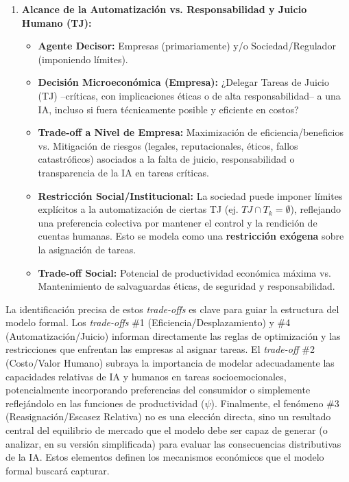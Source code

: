 \documentclass{article}
\theoremstyle{remark}
\theoremstyle{definition}
\begin{document}
\begin{enumerate}
\begin{tcolorbox}[title= Solución Punto 1 (Revisado - Versión Preferida)]
\begin{enumerate}
    \item \textbf{Alcance de la Automatización vs. Responsabilidad y Juicio Humano (TJ):}
         \begin{itemize}
            \item \textbf{Agente Decisor:} Empresas (primariamente) y/o Sociedad/Regulador (imponiendo límites).
            \item \textbf{Decisión Microeconómica (Empresa):} ¿Delegar Tareas de Juicio (TJ) –críticas, con implicaciones éticas o de alta responsabilidad– a una IA, incluso si fuera técnicamente posible y eficiente en costos?
            \item \textbf{Trade-off a Nivel de Empresa:} Maximización de eficiencia/beneficios vs. Mitigación de riesgos (legales, reputacionales, éticos, fallos catastróficos) asociados a la falta de juicio, responsabilidad o transparencia de la IA en tareas críticas.
            \item \textbf{Restricción Social/Institucional:} La sociedad puede imponer límites explícitos a la automatización de ciertas TJ (ej. $TJ \cap T_k = \emptyset$), reflejando una preferencia colectiva por mantener el control y la rendición de cuentas humanas. Esto se modela como una \textbf{restricción exógena} sobre la asignación de tareas.
            \item \textbf{Trade-off Social:} Potencial de productividad económica máxima vs. Mantenimiento de salvaguardas éticas, de seguridad y responsabilidad.
        \end{itemize}
\end{enumerate}

\vspace{1em} %

La identificación precisa de estos \textit{trade-offs} es clave para guiar la estructura del modelo formal. Los \textit{trade-offs} \#1 (Eficiencia/Desplazamiento) y \#4 (Automatización/Juicio) informan directamente las reglas de optimización y las restricciones que enfrentan las empresas al asignar tareas. El \textit{trade-off} \#2 (Costo/Valor Humano) subraya la importancia de modelar adecuadamente las capacidades relativas de IA y humanos en tareas socioemocionales, potencialmente incorporando preferencias del consumidor o simplemente reflejándolo en las funciones de productividad ($\psi$). Finalmente, el fenómeno \#3 (Reasignación/Escasez Relativa) no es una elección directa, sino un resultado central del equilibrio de mercado que el modelo debe ser capaz de generar (o analizar, en su versión simplificada) para evaluar las consecuencias distributivas de la IA. Estos elementos definen los mecanismos económicos que el modelo formal buscará capturar.


\end{tcolorbox}
\end{enumerate}
\end{document}
